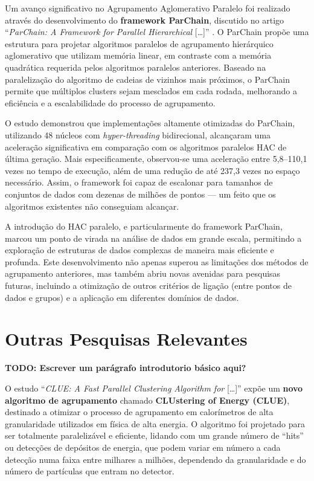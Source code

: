 \documentclass[12pt,
openright, 
oneside, %
a4paper,    %
brazil]{facom-ufu-abntex2}
\begin{document}
Um avanço significativo no Agrupamento Aglomerativo Paralelo foi realizado através do desenvolvimento do \textbf{framework ParChain}, discutido no artigo \enquote{\textit{ParChain: A Framework for Parallel Hierarchical} [\dots]} \cite{parChainHAC2021}. O ParChain propõe uma estrutura para projetar algoritmos paralelos de agrupamento hierárquico aglomerativo que utilizam memória linear, em contraste com a memória quadrática requerida pelos algoritmos paralelos anteriores. Baseado na paralelização do algoritmo de cadeias de vizinhos mais próximos, o ParChain permite que múltiplos clusters sejam mesclados em cada rodada, melhorando a eficiência e a escalabilidade do processo de agrupamento.

O estudo demonstrou que implementações altamente otimizadas do ParChain, utilizando 48 núcleos com \textit{hyper-threading} bidirecional, alcançaram uma aceleração significativa em comparação com os algoritmos paralelos HAC de última geração. Mais especificamente, observou-se uma aceleração entre 5,8--110,1 vezes no tempo de execução, além de uma redução de até 237,3 vezes no espaço necessário. Assim, o framework foi capaz de escalonar para tamanhos de conjuntos de dados com dezenas de milhões de pontos --- um feito que os algoritmos existentes não conseguiam alcançar.

A introdução do HAC paralelo, e particularmente do framework ParChain, marcou um ponto de virada na análise de dados em grande escala, permitindo a exploração de estruturas de dados complexas de maneira mais eficiente e profunda. Este desenvolvimento não apenas superou as limitações dos métodos de agrupamento anteriores, mas também abriu novas avenidas para pesquisas futuras, incluindo a otimização de outros critérios de ligação (entre pontos de dados e grupos) e a aplicação em diferentes domínios de dados.




\section{Outras Pesquisas Relevantes}

\textbf{TODO: Escrever um parágrafo introdutorio básico aqui?}


O estudo \enquote{\textit{CLUE: A Fast Parallel Clustering Algorithm for} [\dots]} \cite{clueParallelAlgo2020} expõe um \textbf{novo algoritmo de agrupamento} chamado \textbf{CLUstering of Energy (CLUE)}, destinado a otimizar o processo de agrupamento em calorímetros de alta granularidade utilizados em física de alta energia. O algoritmo foi projetado para ser totalmente paralelizável e eficiente, lidando com um grande número de \enquote{hits} ou detecções de depósitos de energia, que podem variar em número a cada detecção numa faixa entre milhares a milhões, dependendo da granularidade e do número de partículas que entram no detector.
\end{document}
